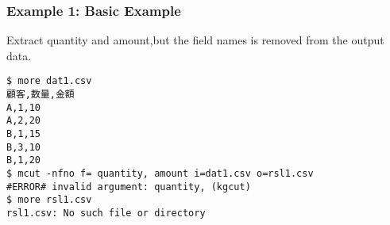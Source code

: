 \subsubsection*{Example 1: Basic Example}

Extract quantity and amount,but the field names is removed from the output data.


\begin{Verbatim}[baselinestretch=0.7,frame=single]
$ more dat1.csv
顧客,数量,金額
A,1,10
A,2,20
B,1,15
B,3,10
B,1,20
$ mcut -nfno f= quantity, amount i=dat1.csv o=rsl1.csv
#ERROR# invalid argument: quantity, (kgcut)
$ more rsl1.csv
rsl1.csv: No such file or directory
\end{Verbatim}

